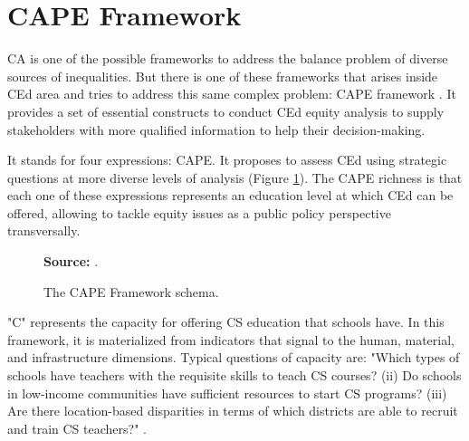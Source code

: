 \section{CAPE Framework}
\label{equity-sec:cape}

\gls{CA} is one of the possible frameworks to address the balance problem of diverse sources of inequalities. But there is one of these frameworks that arises inside \gls{CEd} area and tries to address this same complex problem: \gls{CAPE} framework \cite{fletcher:2021}. It provides a set of essential constructs to conduct \gls{CEd} equity analysis to supply stakeholders with more qualified information to help their decision-making.

It stands for four expressions: \acrfull{CAPE}. It proposes to assess \gls{CEd} using strategic questions at more diverse levels of analysis (Figure \ref{fig:cape-framework}). The \gls{CAPE} richness is that each one of these expressions represents an education level at which \gls{CEd} can be offered, allowing to tackle equity issues as a public policy perspective transversally.

\begin{figure}[ht!]
\centering

\caption{\textmd{The \acrshort{CAPE} Framework schema.}}
\label{fig:cape-framework}

\par\medskip\ABNTEXfontereduzida\selectfont\textbf{Source:} .
\end{figure}

"C" represents the capacity for offering \gls{CS} education that schools have. In this framework, it is materialized from indicators that signal to the human, material, and infrastructure dimensions. Typical questions of capacity are: "Which types of schools have teachers with the requisite skills to teach \gls{CS} courses? (ii) Do schools in low-income communities have sufficient resources to start \gls{CS} programs? (iii) Are there location-based disparities in terms of which districts are able to recruit and train \gls{CS} teachers?" \cite[p.~4]{warner:2022}.

